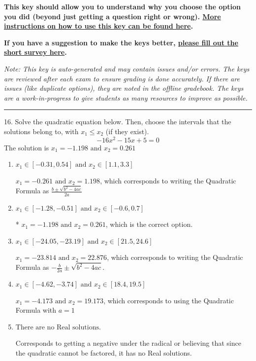 \documentclass{article}[14pt]
\begin{document}
\textbf{This key should allow you to understand why you choose the option you did (beyond just getting a question right or wrong). \href{https://xronos.clas.ufl.edu/mac1105spring2020/courseDescriptionAndMisc/Exams/LearningFromResults}{More instructions on how to use this key can be found here}.}

\textbf{If you have a suggestion to make the keys better, \href{https://forms.gle/CZkbZmPbC9XALEE88}{please fill out the short survey here}.}

\textit{Note: This key is auto-generated and may contain issues and/or errors. The keys are reviewed after each exam to ensure grading is done accurately. If there are issues (like duplicate options), they are noted in the offline gradebook. The keys are a work-in-progress to give students as many resources to improve as possible.}

\rule{\textwidth}{0.4pt}

16. Solve the quadratic equation below. Then, choose the intervals that the solutions belong to, with $x_1 \leq x_2$ (if they exist).
$$ -16x^{2} -15 x + 5 = 0 $$ 
The solution is $ x_1 = -1.198 \text{ and } x_2 = 0.261 $ 

\begin{enumerate}[label=\Alph*.] 
\item $ x_1 \in [-0.31, 0.54] \text{ and } x_2 \in [1.1, 3.3] $ 

  $x_1 = -0.261 \text{ and } x_2 = 1.198$, which corresponds to writing the Quadratic Formula as $\frac{b \pm \sqrt{b^2 - 4ac}}{2a}$ 
\item $ x_1 \in [-1.28, -0.51] \text{ and } x_2 \in [-0.6, 0.7] $ 

 * $x_1 = -1.198 \text{ and } x_2 = 0.261$, which is the correct option. 
\item $ x_1 \in [-24.05, -23.19] \text{ and } x_2 \in [21.5, 24.6] $ 

  $x_1 = -23.814 \text{ and } x_2 = 22.876$, which corresponds to writing the Quadratic Formula as $-\frac{b}{2a} \pm \sqrt{b^2 - 4ac}$. 
\item $ x_1 \in [-4.62, -3.74] \text{ and } x_2 \in [18.4, 19.5] $ 

  $x_1 = -4.173 \text{ and } x_2 = 19.173$, which corresponds to using the Quadratic Formula with $a=1$ 
\item $ \text{There are no Real solutions.} $ 

 Corresponds to getting a negative under the radical or believing that since the quadratic cannot be factored, it has no Real solutions. 
\end{enumerate} 
 
\end{document}
